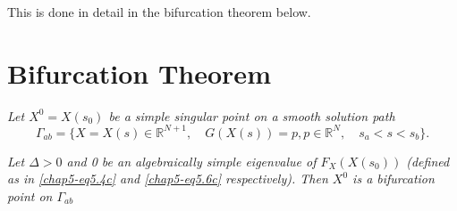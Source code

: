 This is done in detail in the bifurcation theorem below.


\setcounter{section}{7}
\section{Bifurcation Theorem}\label{chap5-sec5.8}%

\textit{Let $X^0 =X(s_0)$ be a simple singular point on a smooth
  solution path} 
$$
\Gamma_{ab}=\{X=X(s) \in \mathbb{R}^{N+1}, \quad G(X(s))=p, p
\in \mathbb{R}^N , \quad s_a <s < s_b \}.
$$

 \textit{Let $\Delta > 0$ and 0 be an algebraically simple
   eigenvalue of $F_X(X(s_0))$ (defined as in \eqref{chap5-eq5.4c} and
   \eqref{chap5-eq5.6c} 
   respectively). Then $X^0$ is a bifurcation point on $ \Gamma_{ab}$} 

